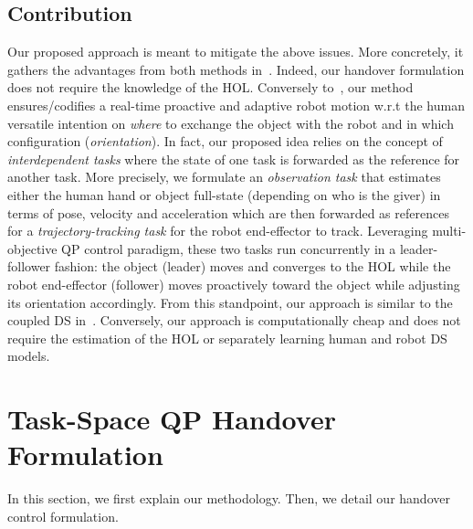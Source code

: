 \subsection{Contribution}\label{subsec-chap4:contribution}
Our proposed approach is meant to mitigate the above issues. More concretely, it gathers the advantages from both methods in~\cite{costanzo2021frontiersRob-AI,medina2016humanoids}. Indeed, our handover formulation does not require the knowledge of the HOL. Conversely to~\cite{costanzo2021frontiersRob-AI}, our method ensures/codifies a real-time proactive and adaptive robot motion w.r.t the human versatile intention on \emph{where} to exchange the object with the robot and in which configuration (\emph{orientation}). In fact, our proposed idea relies on the concept of \emph{interdependent tasks} where the state of one task is forwarded as the reference for another task. More precisely, we formulate an \emph{observation task} that estimates either the human hand or object full-state (depending on who is the giver) in terms of pose, velocity and acceleration which are then forwarded as references for a \emph{trajectory-tracking task} for the robot end-effector to track. Leveraging multi-objective QP control paradigm, these two tasks run concurrently in a leader-follower fashion: the object (leader) moves and converges to the HOL while the robot end-effector (follower) moves proactively toward the object while adjusting its orientation accordingly. From this standpoint, our approach is similar to the coupled DS in~\cite{medina2016humanoids}. Conversely, our approach is computationally cheap and does not require the estimation of the HOL or separately learning human and robot DS models.
\section{Task-Space QP Handover Formulation}\label{sec-chap4:handover formulation}
In this section, we first explain our methodology. Then, we detail our handover control formulation.
